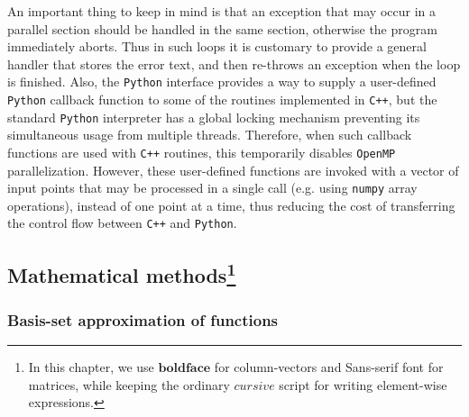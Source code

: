 \documentclass[12pt]{article}
\newcommand{\Cpp}  {\texttt{C++}\xspace}
\newcommand{\Python}{\texttt{Python}\xspace}
\begin{document}
An important thing to keep in mind is that an exception that may occur in a parallel section should be handled in the same section, otherwise the program immediately aborts. Thus in such loops it is customary to provide a general handler that stores the error text, and then re-throws an exception when the loop is finished.
Also, the \Python interface provides a way to supply a user-defined \Python callback function to some of the routines implemented in \Cpp, but the standard \Python interpreter has a global locking mechanism preventing its simultaneous usage from multiple threads. Therefore, when such callback functions are used with \Cpp routines, this temporarily disables \texttt{OpenMP} parallelization. However, these user-defined functions are invoked with a vector of input points that may be processed in a single call (e.g. using \texttt{numpy} array operations), instead of one point at a time, thus reducing the cost of transferring the control flow between \Cpp and \Python.


\subsection[Mathematical methods]
{Mathematical methods\protect\footnote{
In this chapter, we use $\boldsymbol{boldface}$ for column-vectors and \textsf{Sans-serif} font for matrices, while keeping the ordinary $cursive$ script for writing element-wise expressions.}}

\subsubsection{Basis-set approximation of functions}  \label{sec:MathBasisSetDetails}
\end{document}
